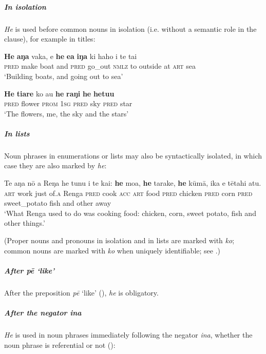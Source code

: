 \subparagraph{In isolation} \textit{He} is used before common nouns in isolation (i.e. without a semantic role in the clause), for example in titles:

\ea\label{ex:5.45}
\gll \textbf{He} \textbf{aŋa} vaka, {\ꞌ}e \textbf{he} \textbf{e{\ꞌ}a} \textbf{iŋa} ki haho i te tai \\
\textsc{pred} make boat and \textsc{pred} go\_out \textsc{nmlz} to outside at \textsc{art} sea \\

\glt 
‘Building boats, and going out to sea’ \textstyleExampleref{[R200 title]}
\z

\ea\label{ex:5.46}
\gll \textbf{He} \textbf{tiare} ko au \textbf{he} \textbf{raŋi} \textbf{he} \textbf{hetu{\ꞌ}u} \\
\textsc{pred} flower \textsc{prom} \textsc{1sg} \textsc{pred} sky \textsc{pred} star \\

\glt 
‘The flowers, me, the sky and the stars’ \textstyleExampleref{[R222 title]}
\z

\subparagraph{In lists} Noun phrases in enumerations or lists may also be syntactically isolated, in which case they are also marked by \textit{he}:

\ea\label{ex:5.47}
\gll Te aŋa nō {\ꞌ}a Reŋa he tunu i te kai: \textbf{he} moa, \textbf{he} tarake,  \textbf{he} kūmā, ika {\ꞌ}e tētahi atu.\\
\textsc{art} work just of\textsc{.a} Renga \textsc{pred} cook \textsc{acc} \textsc{art} food \textsc{pred} chicken \textsc{pred} corn  \textsc{pred} sweet\_potato fish and other away\\

\glt
‘What Renga used to do was cooking food: chicken, corn, sweet potato, fish and other things.’ \textstyleExampleref{[R363.119]} 
\z

(Proper nouns and pronouns in isolation and in lists are marked with \textit{ko}; common nouns are marked with \textit{ko} when uniquely identifiable; see .)

\subparagraph{After \textit{pē} ‘like’} After the preposition \textit{pē} ‘like’ (), \textit{he} is obligatory.

\subparagraph{After the negator \textit{{\ꞌ}ina}} \textit{He} is used in noun phrases immediately following the negator \textit{{\ꞌ}ina}, whether the noun phrase is referential or not ():

